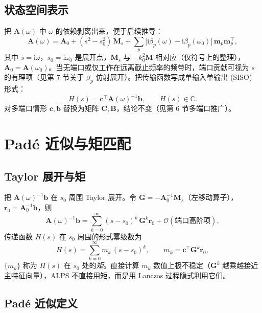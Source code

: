 \documentclass[11pt,a4paper]{ctexart}
\newcommand{\C}{\mathbb{C}}
\newcommand{\im}{\mathrm{i}}
\begin{document}
\subsection{状态空间表示}

把 $\bm A(\omega)$ 中 $\omega$ 的依赖剥离出来，便于后续推导：
\begin{equation}
  \bm A(\omega)
  = \bm A_0 + (s^2 - s_0^2)\,\bm M_s + \sum_{p}\big[\im\beta_p(\omega) - \im\beta_p(\omega_0)\big]\,\bm m_p\bm m_p^{\!\top},
  \label{eq:expansion}
\end{equation}
其中 $s = \im\omega$，$s_0 = \im\omega_0$ 是展开点，$\bm M_s$ 与 $-k_0^2\bm M$ 相对应（仅符号上的整理），$\bm A_0 = \bm A(\omega_0)$。当无端口或仅工作在远离截止频率的频带时，端口贡献可视为 $s$ 的有理项（见第 7 节关于 $\beta_p$ 仿射展开）。把传输函数写成单输入单输出 (SISO) 形式：
\begin{equation}
  H(s) = \bm c^{\!\top}\bm A(\omega)^{-1}\bm b,\qquad
  H(s) \in \C.
  \label{eq:transfer}
\end{equation}
对多端口情形 $\bm c,\bm b$ 替换为矩阵 $\bm C,\bm B$，结论不变（见第 6 节多端口推广）。

\section{Padé 近似与矩匹配}

\subsection{Taylor 展开与矩}

把 $\bm A(\omega)^{-1}\bm b$ 在 $s_0$ 周围 Taylor 展开。令 $\bm G = -\bm A_0^{-1}\bm M_s$（左移动算子），$\bm r_0 = \bm A_0^{-1}\bm b$，则
\begin{equation}
  \bm A(\omega)^{-1}\bm b
  = \sum_{k=0}^{\infty} (s-s_0)^{k}\,\bm G^{k}\bm r_0
  + \mathcal O(\text{端口高阶项}),
\end{equation}
传递函数 $H(s)$ 在 $s_0$ 周围的形式幂级数为
\begin{equation}
  H(s) = \sum_{k=0}^{\infty} m_k\,(s-s_0)^{k},\qquad
  m_k = \bm c^{\!\top}\bm G^{k}\bm r_0,
\end{equation}
$\{m_k\}$ 称为 $H(s)$ 在 $s_0$ 处的\emph{矩}。直接计算 $m_k$ 数值上极不稳定（$\bm G^k$ 越乘越接近主特征向量），ALPS 不直接用矩，而是用 Lanczos 过程隐式利用它们。

\subsection{Padé 近似定义}
\end{document}
